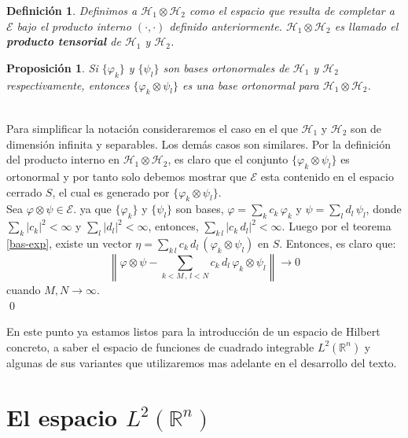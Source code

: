 \documentclass[12pt]{book}
\numberwithin{equation}{chapter}
\newtheorem{definition}[theorem]{Definici\'on}
\newtheorem{proposition}[theorem]{Proposici\'on}
\def\n{\noindent}
\def\R{\mathbb{R}}
\def\E{\mathcal{E}}
\def\rar{\rightarrow}
\def\H{\mathcal{H}}
\def\pr{\otimes}
\def\vp{\varphi}
\begin{document}
\vspace{5 mm}

\begin{definition}
Definimos a $ \H_{1} \pr \H_{2} $ como el espacio que resulta de completar a $\E$ bajo el producto interno $( \cdot , \cdot )$ definido anteriormente. $\H_{1} \pr \H_{2}$ es llamado el {\bf producto tensorial} de $\H_{1}$ y $\H_{2}$.
\end{definition}


\begin{proposition}\label{pt-b}
Si $\{ \vp_{k} \}$ y $\{ \psi_{l} \}$ son bases ortonormales de $\H_{1}$ y $\H_{2}$ respectivamente, entonces $\{ \vp_{k} \pr \psi_{l} \}$ es una base ortonormal para $ \H_{1} \pr \H_{2} $.
\end{proposition}
\n {\bf Demostraci\'on}\\
Para simplificar la notaci\'on consideraremos el caso en el que $\H_{1}$ y $\H_{2}$ son de dimensi\'on infinita y separables. Los dem\'as casos son similares. Por la definici\'on del producto interno en $\H_{1} \pr \H_{2}$, es claro que el conjunto $\{ \vp_{k} \pr \psi_{l} \}$ es ortonormal y por tanto solo debemos mostrar que $\E$ esta contenido en el espacio cerrado $S$, el cual es generado por $\{ \vp_{k} \pr \psi_{l} \}$. \\
Sea $ \vp \pr \psi \in \E $. ya que $\{ \vp_{k} \}$ y $\{ \psi_{l} \}$ son bases, $ \vp= \sum_{k} c_{k}\, \vp_{k}$ y $ \psi= \sum_{l} d_{l}\, \psi_{l} $, donde $\sum_{k} |c_{k}|^{2} < \infty$ y $ \sum_{l} |d_{l}|^{2} < \infty $, entonces, $\sum_{k\,l} | c_{k}\,d_{l} |^{2} < \infty $. Luego por el teorema \ref{bas-exp}, existe un vector $ \eta = \sum_{k\,l} c_{k}\,d_{l}\, ( \vp_{k} \pr \psi_{l} ) $ en $S$. Entonces, es claro que:
$$ \left\| \vp \pr \psi - \sum_{k<M \,,\, l<N} c_{k}\,d_{l}\, \vp_{k} \pr \psi_{l} \right\| \longrightarrow 0 $$
cuando $M,N \rar \infty$. \\ \qed

\vspace{5 mm}

En este punto ya estamos listos para la introducci\'on de un espacio de Hilbert concreto, a saber el espacio de funciones de cuadrado integrable $L^{2}(\R^{n})$ y algunas de sus variantes que utilizaremos mas adelante en el desarrollo del texto.

\newpage

\chapter{El espacio $L^{2}(\R^{n})$}
\end{document}
